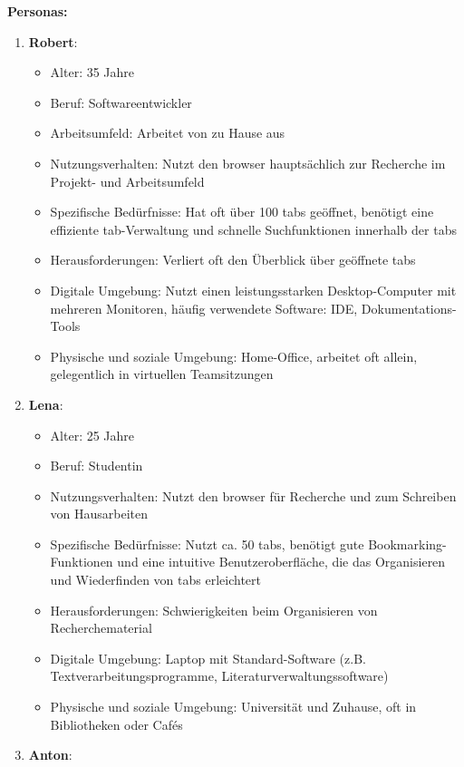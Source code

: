 \textbf{Personas:}
\begin{enumerate}
    \item \textbf{Robert}:
    \begin{itemize}
        \item Alter: 35 Jahre
        \item Beruf: Softwareentwickler
        \item Arbeitsumfeld: Arbeitet von zu Hause aus
        \item Nutzungsverhalten: Nutzt den \gls{browser} hauptsächlich zur Recherche im Projekt- und Arbeitsumfeld
        \item Spezifische Bedürfnisse: Hat oft über 100 \gls{tab}s geöffnet, benötigt eine effiziente \gls{tab}-Verwaltung und schnelle Suchfunktionen innerhalb der \gls{tab}s
        \item Herausforderungen: Verliert oft den Überblick über geöffnete \gls{tab}s
        \item Digitale Umgebung: Nutzt einen leistungsstarken Desktop-Computer mit mehreren Monitoren, häufig verwendete Software: \ac{IDE}, Dokumentations-Tools
        \item Physische und soziale Umgebung: Home-Office, arbeitet oft allein, gelegentlich in virtuellen Teamsitzungen
    \end{itemize}
    \item \textbf{Lena}:
    \begin{itemize}
        \item Alter: 25 Jahre
        \item Beruf: Studentin
        \item Nutzungsverhalten: Nutzt den \gls{browser} für Recherche und zum Schreiben von Hausarbeiten
        \item Spezifische Bedürfnisse: Nutzt ca. 50 \gls{tab}s, benötigt gute Bookmarking-Funktionen und eine intuitive Benutzeroberfläche, die das Organisieren und Wiederfinden von \gls{tab}s erleichtert
        \item Herausforderungen: Schwierigkeiten beim Organisieren von Recherchematerial
        \item Digitale Umgebung: Laptop mit Standard-Software (z.B. Textverarbeitungsprogramme, Literaturverwaltungssoftware)
        \item Physische und soziale Umgebung: Universität und Zuhause, oft in Bibliotheken oder Cafés
    \end{itemize}
    \item \textbf{Anton}:
    \begin{itemize}

\end{itemize}
\end{enumerate}
